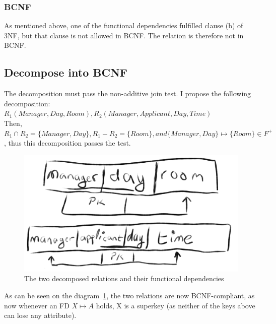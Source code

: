 \documentclass[12pt]{article}
\begin{document}
\subsubsection {BCNF}
As mentioned above, one of the functional dependencies fulfilled clause (b) of 3NF, but that clause is not allowed in BCNF. The relation is therefore not in BCNF\@.

\subsection {Decompose into BCNF}\label{subsec:decompose-into-bcnf}

The decomposition must pass the non-additive join test.
I propose the following decomposition: \(R_1(Manager, Day, Room), R_2(Manager, Applicant, Day, Time)\)\\
Then, \(R_1 \cap R_2 = \{Manager, Day\}, R_1 - R_2 = \{Room\}, and \{Manager, Day\} \mapsto \{Room\} \in F^+\), thus this decomposition passes the test.

\begin {figure}[h]
\includegraphics[width=\textwidth]{BCNF}
\caption{The two decomposed relations and their functional dependencies}\label{fig:ER}
\end {figure}

As can be seen on the diagram~\ref{fig:ER}, the two relations are now BCNF-compliant, as now whenever an FD \(X \mapsto A\) holds, X is a superkey (as neither of the keys above can lose any attribute).
\end{document}
